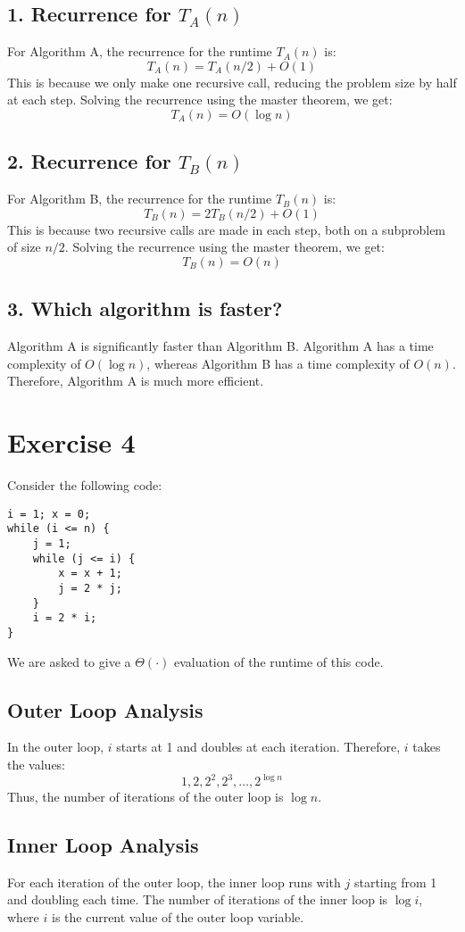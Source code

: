 \documentclass[11pt]{article}
\begin{document}
\subsection*{1. Recurrence for $T_A(n)$}
For Algorithm A, the recurrence for the runtime $T_A(n)$ is:
\[
T_A(n) = T_A(n/2) + O(1)
\]
This is because we only make one recursive call, reducing the problem size by half at each step. Solving the recurrence using the master theorem, we get:
\[
T_A(n) = O(\log n)
\]

\subsection*{2. Recurrence for $T_B(n)$}
For Algorithm B, the recurrence for the runtime $T_B(n)$ is:
\[
T_B(n) = 2T_B(n/2) + O(1)
\]
This is because two recursive calls are made in each step, both on a subproblem of size $n/2$. Solving the recurrence using the master theorem, we get:
\[
T_B(n) = O(n)
\]

\subsection*{3. Which algorithm is faster?}
Algorithm A is significantly faster than Algorithm B. Algorithm A has a time complexity of $O(\log n)$, whereas Algorithm B has a time complexity of $O(n)$. Therefore, Algorithm A is much more efficient.

\section*{Exercise 4}

Consider the following code:

\begin{verbatim}
i = 1; x = 0;
while (i <= n) {
    j = 1;
    while (j <= i) {
        x = x + 1;
        j = 2 * j;
    }
    i = 2 * i;
}
\end{verbatim}

We are asked to give a $\Theta(\cdot)$ evaluation of the runtime of this code.

\subsection*{Outer Loop Analysis}
In the outer loop, $i$ starts at 1 and doubles at each iteration. Therefore, $i$ takes the values:
\[
1, 2, 2^2, 2^3, \dots, 2^{\log n}
\]
Thus, the number of iterations of the outer loop is $\log n$.

\subsection*{Inner Loop Analysis}
For each iteration of the outer loop, the inner loop runs with $j$ starting from 1 and doubling each time. The number of iterations of the inner loop is $\log i$, where $i$ is the current value of the outer loop variable.
\end{document}
